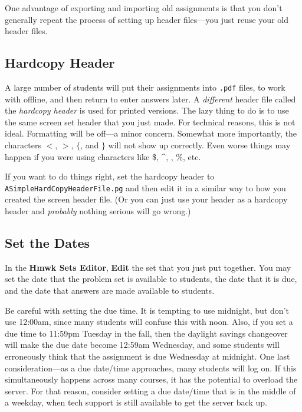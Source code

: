 \documentclass[12pt]{article}
\newcommand{\menu}[1]{\textbf{#1}}
\newcommand{\HSE}{\menu{Hmwk Sets Editor}}
\begin{document}
One advantage of exporting and importing old assignments is that you don't generally repeat the process of setting up header files---you just reuse your old header files.

\subsection{Hardcopy Header} 

A large number of students will put their assignments into \texttt{.pdf} files, to work with offline, and then return to enter answers later.  A \emph{different} header file called the \emph{hardcopy header} is used for printed versions.  The lazy thing to do is to use the same screen set header that you just made.  For technical reasons, this is not ideal. Formatting will be off---a minor concern.  Somewhat more importantly, the characters $<$, $>$, $\{$, and $\}$ will not show up correctly.  Even worse things may happen if you were using characters like \$, \^{}, \textunderscore, \%, etc. 

If you want to do things right, set the hardcopy header to \texttt{ASimpleHardCopyHeaderFile.pg} and then edit it in a similar way to how you created the screen header file. (Or you can just use your header as a hardcopy header and \emph{probably} nothing serious will go wrong.)

\subsection{Set the Dates} In the \HSE, \menu{Edit} the set that you just put together.  You may set the date that the problem set is available to students, the date that it is due, and the date that answers are made available to students.

Be careful with setting the due time.  It is tempting to use midnight, but don't use 12:00{\sc am}, since many students will confuse this with noon.  Also, if you set a due time to 11:59{\sc pm} Tuesday in the fall, then the daylight savings changeover will make the due date become 12:59{\sc am} Wednesday, and some students will erroneously think that the assignment is due Wednesday at midnight.  One last consideration---as a due date/time approaches, many students will log on. If this simultaneously happens across many courses, it has the potential to overload the server. For that reason, consider setting a due date/time that is in the middle of a weekday, when tech support is still available to get the server back up.
\end{document}
